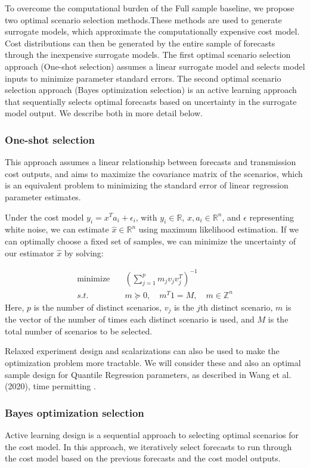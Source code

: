 \documentclass[10pt,twocolumn,letterpaper]{article}
\begin{document}
To overcome the computational burden of the Full sample baseline, we propose two optimal scenario selection methods.These methods are used to generate surrogate models, which approximate the computationally expensive cost model. Cost distributions can then be generated by the entire sample of forecasts through the inexpensive surrogate models. The first optimal scenario selection approach (One-shot selection) assumes a linear surrogate model and selects model inputs to minimize parameter standard errors. The second optimal scenario selection approach (Bayes optimization selection) is an active learning approach that sequentially selects optimal forecasts based on uncertainty in the surrogate model output. We describe both in more detail below. 

\subsubsection{One-shot selection}
This approach assumes a linear relationship between forecasts and transmission cost outputs, and aims to maximize the covariance matrix of the scenarios, which is an equivalent problem to minimizing the standard error of linear regression parameter estimates. 

Under the cost model $y_i = x^Ta_i + \epsilon_i$, with $y_i \in \mathbb{R}$, $x, a_i \in \mathbb{R}^n$, and $\epsilon$ representing white noise, we can estimate $\hat{x}\in \mathbb{R}^n$ using maximum likelihood estimation. If we can optimally choose a fixed set of samples, we can minimize the uncertainty of our estimator $\hat{x}$ by solving:

\begin{align*}
\textrm{minimize} \quad & \left(\sum_{j=1}^pm_jv_jv_j^T\right)^{-1}\\
s.t. \quad & m \succeq 0, \quad m^T1 = M, \quad m \in \mathbb{Z}^n
\end{align*}
Here, $p$ is the number of distinct scenarios, $v_j$ is the $j$th distinct scenario, $m$ is the vector of the number of times each distinct scenario is used, and $M$ is the total number of scenarios to be selected.

Relaxed experiment design and scalarizations can also be used to make the optimization problem more tractable. We will consider these and also an optimal sample design for Quantile Regression parameters, as described in Wang et al. (2020), time permitting \cite{wang2020optimal}.

\subsubsection{Bayes optimization selection}
Active learning design is a sequential approach to selecting optimal scenarios for the cost model. In this approach, we iteratively select forecasts to run through the cost model based on the previous forecasts and the cost model outputs.
\end{document}
